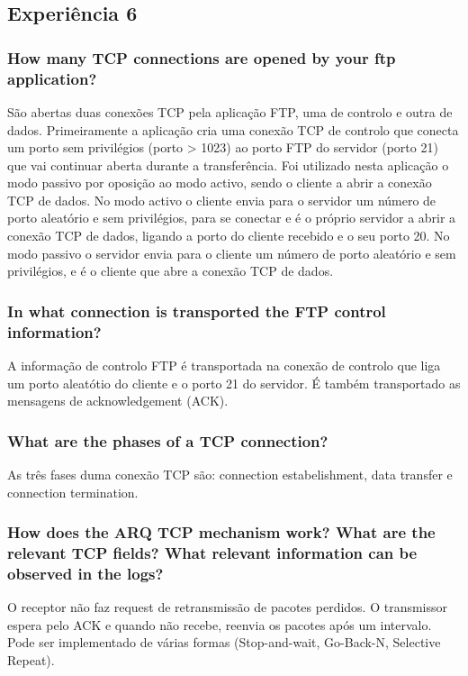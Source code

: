 \documentclass[a4paper]{article}
\begin{document}
\subsection{Experiência 6}

\subsubsection{How many TCP connections are opened by your ftp application?}

São abertas duas conexões TCP pela aplicação FTP, uma de controlo e outra de dados.
Primeiramente a aplicação cria uma conexão TCP de controlo que conecta um porto sem privilégios (porto > 1023) ao porto FTP do servidor (porto 21) que vai continuar aberta durante a transferência.
Foi utilizado nesta aplicação o modo passivo por oposição ao modo activo, sendo o cliente a abrir a conexão TCP de dados.
No modo activo o cliente envia para o servidor um número de porto aleatório e sem privilégios, para se conectar e é o próprio servidor a abrir a conexão TCP de dados, ligando a porto do cliente recebido e o seu porto 20.
No modo passivo o servidor envia para o cliente um número de porto aleatório e sem privilégios, e é o cliente que abre a conexão TCP de dados.

\subsubsection{In what connection is transported the FTP control information?}

A informação de controlo FTP é transportada na conexão de controlo que liga um porto aleatótio do cliente e o porto 21 do servidor. É também transportado as mensagens de acknowledgement (ACK).

\subsubsection{What are the phases of a TCP connection?}

As três fases duma conexão TCP são: connection estabelishment, data transfer e connection termination.

\subsubsection{How does the ARQ TCP mechanism work? What are the relevant TCP
fields? What relevant information can be observed in the logs?}

O receptor não faz request de retransmissão de pacotes perdidos. O transmissor espera pelo ACK e quando
não recebe, reenvia os pacotes após um intervalo. Pode ser implementado de várias formas (Stop-and-wait, Go-Back-N,
Selective Repeat).
\end{document}

